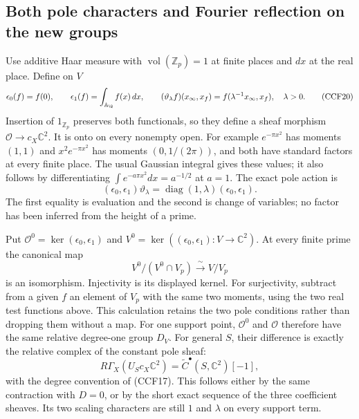 \documentclass[11pt,a4paper]{article}
\theoremstyle{definition}\newtheorem{definition}[theorem]{Definition}
\begin{document}
\subsection{Both pole characters and Fourier reflection on the new groups}

Use additive Haar measure with $\operatorname{vol}(\mathbb Z_p)=1$
at finite places and $dx$ at the real place. Define on $V$
\[
 \epsilon_0(f)=f(0),\qquad \epsilon_1(f)=\int_{\mathbb A_\Q}f(x)\,dx,
 \qquad (\vartheta_\lambda f)(x_\infty,x_f)
       =f(\lambda^{-1}x_\infty,x_f),\quad\lambda>0.
 \tag{CCF20}
\]
Insertion of $1_{\mathbb Z_p}$ preserves both functionals, so
they define a sheaf morphism
$\mathcal O\to c_X\mathbb C^2$. It is onto on every nonempty
open. For example $e^{-\pi x^2}$ has moments $(1,1)$ and
$x^2e^{-\pi x^2}$ has moments $(0,1/(2\pi))$, and both have
standard factors at every finite place. The usual Gaussian
integral gives these values; it also follows by differentiating
$\int e^{-a\pi x^2}dx=a^{-1/2}$ at $a=1$.
The exact pole action is
\[
 (\epsilon_0,\epsilon_1)\vartheta_\lambda
       =\operatorname{diag}(1,\lambda)(\epsilon_0,\epsilon_1).
 \tag{CCF21}
\]
The first equality is evaluation and the second is change of
variables; no factor has been inferred from the height of a prime.

Put $\mathcal O^0=\ker(\epsilon_0,\epsilon_1)$ and
$V^0=\ker((\epsilon_0,\epsilon_1):V\to\mathbb C^2)$.
At every finite prime the canonical map
\[
 V^0/(V^0\cap V_p)\xrightarrow{\ \sim\ }V/V_p
 \tag{CCF22}
\]
is an isomorphism. Injectivity is its displayed kernel. For
surjectivity, subtract from a given $f$ an element of $V_p$
with the same two moments, using the two real test functions
above. This calculation retains the two pole conditions rather
than dropping them without a map. For one support point,
$\mathcal O^0$ and $\mathcal O$ therefore have the same relative
degree-one group $D_V$. For general $S$, their difference is
exactly the relative complex of the constant pole sheaf:
\[
 R\Gamma_X(U_Sc_X\mathbb C^2)
       =\widetilde C^\bullet(S,\mathbb C^2)[-1],
 \tag{CCF23}
\]
with the degree convention of (CCF17). This follows either
by the same contraction with $D=0$, or by the short exact
sequence of the three coefficient sheaves. Its two scaling
characters are still $1$ and $\lambda$ on every support term.
\end{document}
